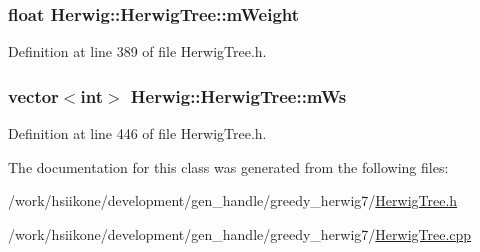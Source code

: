 \subsubsection[{\texorpdfstring{m\+Weight}{mWeight}}]{\setlength{\rightskip}{0pt plus 5cm}float Herwig\+::\+Herwig\+Tree\+::m\+Weight\hspace{0.3cm}{\ttfamily [protected]}}\hypertarget{class_herwig_1_1_herwig_tree_a161ab96ab6f288fcf9ae7da484b690f8}{}\label{class_herwig_1_1_herwig_tree_a161ab96ab6f288fcf9ae7da484b690f8}


Definition at line 389 of file Herwig\+Tree.\+h.

\subsubsection[{\texorpdfstring{m\+Ws}{mWs}}]{\setlength{\rightskip}{0pt plus 5cm}vector$<$int$>$ Herwig\+::\+Herwig\+Tree\+::m\+Ws\hspace{0.3cm}{\ttfamily [protected]}}\hypertarget{class_herwig_1_1_herwig_tree_a19bd4f1ed5bc10ff4523cf3f8120b670}{}\label{class_herwig_1_1_herwig_tree_a19bd4f1ed5bc10ff4523cf3f8120b670}


Definition at line 446 of file Herwig\+Tree.\+h.



The documentation for this class was generated from the following files\+:\begin{DoxyCompactItemize}
\item 
/work/hsiikone/development/gen\+\_\+handle/greedy\+\_\+herwig7/\hyperlink{_herwig_tree_8h}{Herwig\+Tree.\+h}\item 
/work/hsiikone/development/gen\+\_\+handle/greedy\+\_\+herwig7/\hyperlink{_herwig_tree_8cpp}{Herwig\+Tree.\+cpp}\end{DoxyCompactItemize}

